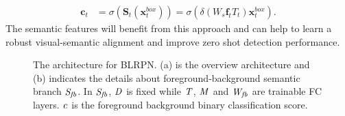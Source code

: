\documentclass[runningheads]{llncs}
\begin{document}
\begin{equation}
\begin{split}
   \mathbf{c}_{t} &= \sigma(\mathbf{S}_{t}(\mathbf{x}_{t}^{box})) = \sigma(\delta(W_{s}\mathbf{f}_{t}T_{t})\mathbf{x}_{t}^{box}).
\end{split}
\label{con:eq6}
\end{equation}
The semantic features will benefit from this approach and can help to learn a robust visual-semantic alignment and improve zero shot detection performance.
\begin{figure}
\centering
{}
\caption{The architecture for BLRPN. (a) is the overview architecture and (b) indicates the details about foreground-background semantic branch $\it {S}_{fb}$. In $\it {S}_{fb}$, $\it {D}$ is fixed while $\it {T}$, $\it {M}$ and $\it {W_{fb}}$ are trainable FC layers. $\it c$ is the foreground background binary classification score.}
\label{fig:figure3}
\end{figure}
\end{document}
